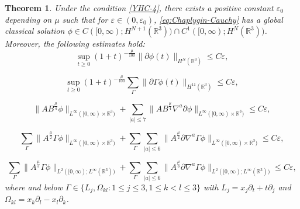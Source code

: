 \documentclass[11pt,twoside]{article}
\def\f{\frac}
\def\p{\partial}
\theoremstyle{plain}
\newtheorem{theorem}{Theorem}[section]
\theoremstyle{definition}
\theoremstyle{assumption}
\numberwithin{equation}{section}
\begin{document}
	
\begin{theorem}\label{thm:main-global}
Under the condition \eqref{YHC-4},
there exists a positive constant $\varepsilon_0$ depending on $\mu$ such that for
$\varepsilon\in(0,\varepsilon_0)$, \eqref{eq:Chaplygin-Cauchy} has a global classical
solution $\phi\in C([0,\infty);H^{N+1}(\mathbb R^3))\cap C^1([0,\infty);H^N(\mathbb R^3))$.
Moreover, the following estimates hold:
		\begin{equation}\label{YHCCC-1}
			\sup_{t\ge 0}(1+t)^{-\f\mu{100}}\|\partial\phi(t)\|_{H^N(\mathbb R^3)}
			\le C\varepsilon,
		\end{equation}
		
		\begin{equation}\label{YHCCC-2}
			\sup_{t\ge 0}(1+t)^{-\f\mu{100}}\sum_{\Gamma}\|\partial\Gamma\phi(t)\|_{H^{11}(\mathbb R^3)}
			\le C\varepsilon,
		\end{equation}
		
		\begin{equation}\label{YHCCC-3}
			\bigl\|AB^{\frac{\mu}{4}}\phi\bigr\|_{L^\infty([0,\infty)\times\mathbb R^3)}
			+\sum_{|a|\le 7}\bigl\|AB^{\frac{\mu}{4}}\nabla^a\partial\phi\bigr\|_{L^\infty([0,\infty)\times\mathbb R^3)}
			\le C\varepsilon,
		\end{equation}
		
		\begin{equation}\label{YHCCC-4}
			\sum_{\Gamma}\bigl\|A^{\frac{\mu}{2}}\Gamma\phi\bigr\|_{L^\infty([0,\infty)\times\mathbb R^3)}
			+\sum_{\Gamma}\sum_{|a|\le 6}\bigl\|A^{\frac{\mu}{2}}\partial\nabla^a\Gamma\phi\bigr\|_{L^\infty([0,\infty)\times\mathbb R^3)}
			\le C\varepsilon,
		\end{equation}
		
		\begin{equation}\label{YHCCC-5}
			\sum_{\Gamma}\bigl\|A^{\frac{\mu}{3}}\Gamma\phi\bigr\|_{L^2([0,\infty);L^\infty(\mathbb R^3))}
			+\sum_{\Gamma}\sum_{|a|\le 6}\bigl\|A^{\frac{\mu}{3}}\partial\nabla^a\Gamma\phi\bigr\|_{L^2([0,\infty);L^\infty(\mathbb R^3))}
			\le C\varepsilon,
		\end{equation}
	where and below $\Gamma\in
	\{L_j,\Omega_{kl}: 1\le j\le3, 1\le k<l\le3\}$ with $L_j=x_j\p_t+t\p_j$ and $\Omega_{kl}=x_k\p_l-x_l\p_k$.
	\end{theorem}
	
\end{document}
